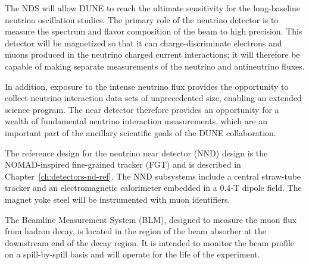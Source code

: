 The NDS will allow DUNE
to reach the ultimate 
sensitivity for the long-baseline neutrino oscillation studies.
The primary role of the neutrino detector is to
measure the spectrum and flavor composition of the beam to high precision. This detector
will be magnetized so that it can charge-discriminate electrons and
muons produced in the neutrino charged current interactions; it will therefore be capable of making  
separate measurements of the neutrino and antineutrino fluxes.  
%

In addition, exposure
to the intense neutrino flux provides the opportunity to collect
neutrino interaction data sets of unprecedented size, enabling an extended
science program.  The near detector therefore provides an
opportunity for a wealth of fundamental neutrino interaction
measurements, which are an important part of the ancillary %
scientific
goals of the DUNE collaboration.  

The reference design for the
neutrino near detector (NND) design is the NOMAD-inspired fine-grained
tracker (FGT) and is described in
Chapter~\ref{ch:detectors-nd-ref}. The NND subsystems include a
central straw-tube tracker and an electromagnetic calorimeter embedded
in a 0.4-T dipole field. The magnet yoke steel will be instrumented
with muon identifiers.

The Beamline
Measurement System (BLM), designed to measure the muon
flux from hadron decay, is located in the region of the beam absorber at
the downstream end of the decay region. It is intended to monitor the beam
profile on a spill-by-spill basis and will operate for the life of
the experiment.
